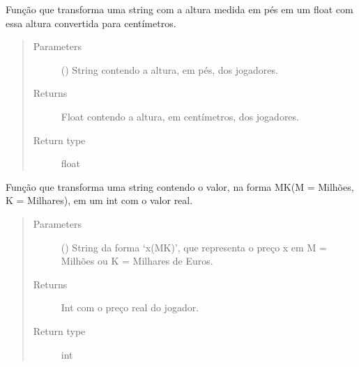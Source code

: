 \documentclass[letterpaper,10pt,brazil]{sphinxmanual}
\begin{document}
\begin{fulllineitems}
\label{\detokenize{funcoes_auxiliares:funcoes_auxiliares.pes_para_cm}}
Função que transforma uma string com a altura medida em pés em um float com essa altura convertida para centímetros.
\begin{quote}\begin{description}
\item[{Parameters}] \leavevmode
{} () \textendash{} String contendo a altura, em pés, dos jogadores.

\item[{Returns}] \leavevmode
Float contendo a altura, em centímetros, dos jogadores.

\item[{Return type}] \leavevmode
float

\end{description}\end{quote}

\end{fulllineitems}


\begin{fulllineitems}
\label{\detokenize{funcoes_auxiliares:funcoes_auxiliares.preco_str_p_int}}
Função que transforma uma string contendo o valor, na forma MK(M = Milhões, K = Milhares), em um int com o valor real.
\begin{quote}\begin{description}
\item[{Parameters}] \leavevmode
{} () \textendash{} String da forma ‘\texteuro{}x(MK)’, que representa o preço x em M = Milhões ou K = Milhares de Euros.

\item[{Returns}] \leavevmode
Int com o preço real do jogador.

\item[{Return type}] \leavevmode
int

\end{description}\end{quote}

\end{fulllineitems}
\end{document}
